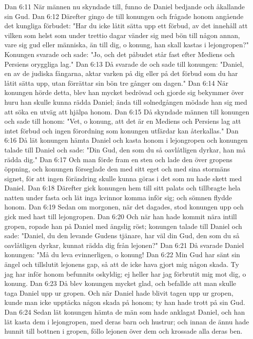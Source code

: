 Dan 6:11  När männen nu skyndade till, funno de Daniel bedjande och åkallande sin Gud.
Dan 6:12  Därefter gingo de till konungen och frågade honom angående det kungliga förbudet: "Har du icke låtit sätta upp ett förbud, av det innehåll att vilken som helst som under trettio dagar vänder sig med bön till någon annan, vare sig gud eller människa, än till dig, o konung, han skall kastas i lejongropen?" Konungen svarade och sade: "Jo, och det påbudet står fast efter Mediens och Persiens oryggliga lag."
Dan 6:13  Då svarade de och sade till konungen: "Daniel, en av de judiska fångarna, aktar varken på dig eller på det förbud som du har låtit sätta upp, utan förrättar sin bön tre gånger om dagen."
Dan 6:14  När konungen hörde detta, blev han mycket bedrövad och gjorde sig bekymmer över huru han skulle kunna rädda Daniel; ända till solnedgången mödade han sig med att söka en utväg att hjälpa honom.
Dan 6:15  Då skyndade männen till konungen och sade till honom: "Vet, o konung, att det är en Mediens och Persiens lag att intet förbud och ingen förordning som konungen utfärdar kan återkallas."
Dan 6:16  Då lät konungen hämta Daniel och kasta honom i lejongropen och konungen talade till Daniel och sade: "Din Gud, den som du så oavlåtligen dyrkar, han må rädda dig."
Dan 6:17  Och man förde fram en sten och lade den över gropens öppning, och konungen förseglade den med sitt eget och med sina stormäns signet, för att ingen förändring skulle kunna göras i det som nu hade skett med Daniel.
Dan 6:18  Därefter gick konungen hem till sitt palats och tillbragte hela natten under fasta och lät inga kvinnor komma inför sig; och sömnen flydde honom.
Dan 6:19  Sedan om morgonen, när det dagades, stod konungen upp och gick med hast till lejongropen.
Dan 6:20  Och när han hade kommit nära intill gropen, ropade han på Daniel med ängslig röst; konungen talade till Daniel och sade: "Daniel, du den levande Gudens tjänare, har väl din Gud, den som du så oavlåtligen dyrkar, kunnat rädda dig från lejonen?"
Dan 6:21  Då svarade Daniel konungen: "Må du leva evinnerligen, o konung!
Dan 6:22  Min Gud har sänt sin ängel och tillslutit lejonens gap, så att de icke hava gjort mig någon skada. Ty jag har inför honom befunnits oskyldig; ej heller har jag förbrutit mig mot dig, o konung.
Dan 6:23  Då blev konungen mycket glad, och befallde att man skulle taga Daniel upp ur gropen. Och när Daniel hade blivit tagen upp ur gropen, kunde man icke upptäcka någon skada på honom; ty han hade trott på sin Gud.
Dan 6:24  Sedan lät konungen hämta de män som hade anklagat Daniel, och han lät kasta dem i lejongropen, med deras barn och hustrur; och innan de ännu hade hunnit till bottnen i gropen, föllo lejonen över dem och krossade alla deras ben.
